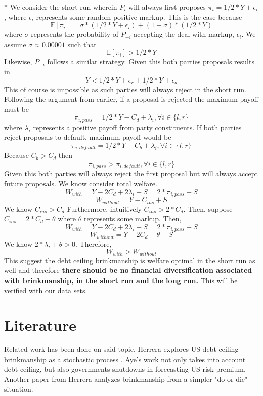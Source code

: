 \documentclass[12pt]{article}
\begin{document}
\noindent $\ast$ We consider the short run wherein $P_i$ will always first proposes $\pi_i=1/2*Y+\epsilon_i$, where $\epsilon_i$ represents some random positive markup. This is the case because $$\mathbb{E}[\pi_i]=\sigma*(1/2*Y+\epsilon_i)+(1-\sigma)*(1/2*Y)$$where $\sigma$ represents the probability of $P_{-i}$ accepting the deal with markup, $\epsilon_i$. We assume $\sigma\approx 0.00001$ such that $$\mathbb{E}[\pi_i]>1/2*Y$$ Likewise, $P_{-i}$ follows a similar strategy. Given this both parties proposals results in $$Y<1/2*Y+\epsilon_r+1/2*Y+\epsilon_d$$This of course is impossible as such parties will always reject in the short run. Following the argument from earlier, if a proposal is rejected the maximum payoff must be$$\pi_{i,pass}=1/2*Y-C_d+\lambda_i , \forall i \in \{l,r\}$$ where $\lambda_i$ represents a positive payoff from party constituents. If both parties reject proposals to default, maximum payoff would be $$\pi_{i,default}=1/2*Y-C_b+\lambda_i, \forall i \in \{l,r\}$$ Because $C_b>C_d$ then $$\pi_{i,pass}>\pi_{i,default} , \forall i \in \{l,r\}$$
Given this both parties will always reject the first proposal but will always accept future proposals. We know consider total welfare. $$W_{with}=Y-2C_d+2\lambda_i+S=2*\pi_{i,pass}+S$$
$$W_{without}=Y-C_{ins}+S$$We know $C_{ins}>C_d$ Furthermore, intuitively $C_{ins}>2*C_d$. Then, suppose $C_{ins}=2*C_d+\theta$ where $\theta$ represents some markup. Then,  $$W_{with}=Y-2C_d+2\lambda_i+S=2*\pi_{i,pass}+S$$
$$ W_{without}=Y-2C_d-\theta+S$$ We know $2* \lambda_i+\theta>0$. Therefore,
$$W_{with}>W_{without}$$ This suggest the debt ceiling brinkmanship is welfare optimal in the short run as well and therefore \textbf{ there should be no financial diversification associated with brinkmanship, in the short run and the long run.} This will be verified with our data sets. 

\section{Literature 
\label{sec:Literature}}
Related work has been done on said topic. Herrera explores US debt ceiling brinkmanship as a stochastic process \citep{Herrera1}. Aye's work not only takes into account debt ceiling, but also governments shutdowns in forecasting US risk premium\citep{Aye}. Another paper from Herrera analyzes brinkmanship from a simpler "do or die" situation\citep{Herrera2}. 
\end{document}
